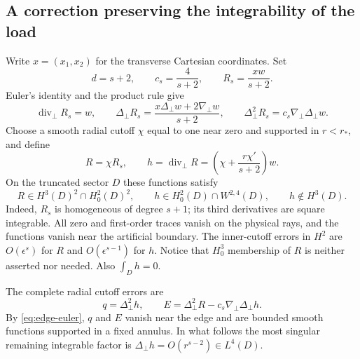 \documentclass[11pt,a4paper]{article}
\theoremstyle{remark}
\numberwithin{equation}{section}
\begin{document}
\subsection{A correction preserving the integrability of the load}
Write $x=(x_1,x_2)$ for the transverse Cartesian coordinates.  Set
\[
 d=s+2,\qquad c_s=\frac4{s+2},\qquad R_s=\frac{xw}{s+2}.
\]
Euler's identity and the product rule give
\begin{equation}\label{eq:edge-euler}
 \operatorname{div}_\perp R_s=w,\qquad
 \Delta_\perp R_s=\frac{x\Delta_\perp w+2\nabla_\perp w}{s+2},\qquad
 \Delta_\perp^2R_s=c_s\nabla_\perp\Delta_\perp w.
\end{equation}
Choose a smooth radial cutoff $\chi$ equal to one near zero and supported
in $r<r_*$, and define
\[
 R=\chi R_s,\qquad
 h=\operatorname{div}_\perp R
 =\left(\chi+\frac{r\chi'}{s+2}\right)w.
\]
On the truncated sector $D$ these functions satisfy
\begin{equation}\label{eq:edge-spaces}
 R\in H^3(D)^2\cap H^2_0(D)^2,\qquad
 h\in H^2_0(D)\cap W^{2,4}(D),\qquad h\notin H^3(D).
\end{equation}
Indeed, $R_s$ is homogeneous of degree $s+1$; its third derivatives are
square integrable.  All zero and first-order traces vanish on the physical
rays, and the functions vanish near the artificial boundary.
The inner-cutoff errors in $H^2$ are $O(\epsilon^s)$ for $R$ and
$O(\epsilon^{s-1})$ for $h$.  Notice that $H^3_0$ membership of $R$ is
neither asserted nor needed.  Also $\int_Dh=0$.

The complete radial cutoff errors are
\[
 q=\Delta_\perp^2h,\qquad
 E=\Delta_\perp^2R-c_s\nabla_\perp\Delta_\perp h.
\]
By \eqref{eq:edge-euler}, $q$ and $E$ vanish near the edge and are bounded
smooth functions supported in a fixed annulus.  In what follows the most
singular remaining integrable factor is
$\Delta_\perp h=O(r^{s-2})\in L^4(D)$.
\end{document}
